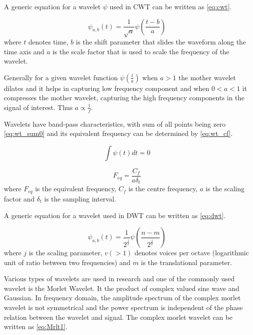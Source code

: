 A generic equation for a wavelet $\psi$ used in CWT can be written as \ref{eq:cwt}.

\begin{equation} \label{eq:cwt}
    \psi_{a,b}(t) = \frac{1}{\sqrt{a}} \psi( \frac{t - b}{a}) 
\end{equation}
where $t$ denotes time, $b$ is the shift parameter that slides the waveform along the time axis and $a$ is the scale factor that is used to scale the frequency of the wavelet.

Generally for a given wavelet function $\psi(\frac{t}{a})$ when $a > 1$ the mother wavelet dilates and it helps in capturing low frequency component and when $0 < a < 1$ it compresses the mother wavelet, capturing the high frequency components in the signal of interest. Thus $a \propto \frac{1}{f}$.

Wavelets have band-pass characteristics, with sum of all points being zero \ref{eq:wt_sum0} and its equivalent frequency can be determined by \ref{eq:wt_cf}.

\begin{equation} \label{eq:wt_sum0}
    \int\psi(t) dt = 0
\end{equation}

\begin{equation} \label{eq:wt_cf}
    F_{eq} = \frac{C_f}{a\delta_t}
\end{equation}
where $F_{eq}$ is the equivalent frequency, $C_f$ is the centre frequency, $a$ is the scaling factor and $\delta_t$ is the sampling interval.

A generic equation for a wavelet used in DWT can be written as \ref{eq:dwt}.

\begin{equation} \label{eq:dwt}
    \psi_{a,b}(t) = \frac{1}{2^{\frac{j}{v}}} \psi( \frac{n - m}{2^{\frac{j}{v}}}) 
\end{equation}
where $j$ is the scaling parameter, $v(>1)$ denotes voices per octave (logarithmic unit of ratio between two frequencies) and $m$ is the translational parameter.


Various types of wavelets are used in research and one of the commonly used wavelet is the Morlet Wavelet. It the product of complex valued sine wave and Gaussian. In frequency domain, the amplitude spectrum of the complex morlet wavelet is not symmetrical and the power spectrum is independent of the phase relation between the wavelet and signal. The complex morlet wavelet can be written as \ref{eq:Mrlt1}.

